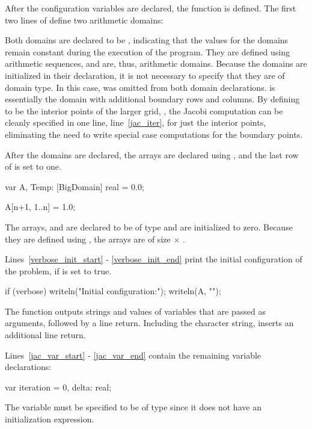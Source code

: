 After the configuration variables are declared, the  function
is defined.  The first two lines of  define two arithmetic domains:
\begin{chapel}
def main() {                       
  const ProblemSpace = [1..n, 1..n],
        BigDomain = [0..n+1, 0..n+1];
\end{chapel}
Both domains are declared to be , indicating
that the values for the domains remain constant during the execution of
the program.  They are defined using arithmetic sequences, and are, thus,
arithmetic domains.  Because the domains are initialized in their declaration,
it is not necessary to specify that they are of domain type.  In this case,
 was omitted from both domain declarations.  
 is essentially the  
domain with additional 
boundary rows and columns.  By defining  to be the interior
points of the larger grid, , the Jacobi computation can be cleanly 
specified in one line, line~\ref{jac_iter}, for just the interior points, 
eliminating the need to write special case computations for the boundary points.

After the domains are declared, the arrays are declared using ,
and the last row of  is set to one.
\begin{chapel}
  var A, Temp: [BigDomain] real = 0.0;

  A[n+1, 1..n] = 1.0;
\end{chapel}
The arrays,  and  are declared to be of type  and
are initialized to zero.  Because they are defined using , the
arrays are of size  $\times$ . 

Lines~\ref{verbose_init_start} - \ref{verbose_init_end} print the initial 
configuration of the problem, if 
is set to true.  
\begin{chapel}
  if (verbose) {                      
    writeln("Initial configuration:");
    writeln(A, "\n");
  }                                   
\end{chapel}
The   function outputs strings and values
of variables that are passed as arguments, followed by a line return.
Including the character string,  inserts an additional line return.

Lines~\ref{jac_var_start} - \ref{jac_var_end} 
contain the remaining variable declarations:
\begin{chapel}
  var iteration = 0,
      delta: real;
\end{chapel}
The variable  must be specified to be of type  since
it does not have an initialization expression.

